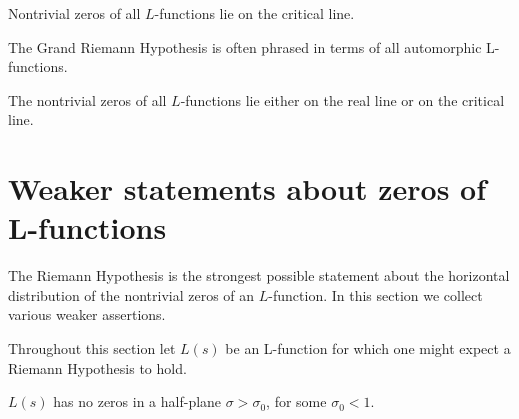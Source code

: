 \documentclass[12pt,letterpaper, reqno]{amsart}
\begin{document}
\begin{problemblock}
\begin{problem}[1.5]
Nontrivial zeros of all $L$-functions
lie on the critical line.
\end{problem}

\begin{distinguishedremark}
The Grand Riemann Hypothesis is often phrased in terms of
all automorphic L-functions.  
\end{distinguishedremark}
\end{problemblock}

\begin{problemblock}
\begin{problem}[1.6]
The nontrivial zeros of all $L$-functions
lie either on the real line or on the critical line.
\end{problem}

\end{problemblock}



\section{Weaker statements about zeros of L-functions}
The Riemann Hypothesis is the strongest possible statement
about the horizontal distribution of the nontrivial zeros
of an $L$-function.  In this section we collect various
weaker assertions. 

Throughout this section let $L(s)$ be an L-function
for which one might expect a Riemann Hypothesis to hold.

\begin{problemblock} 

\begin{problem}[2.1]
 $L(s)$
has no zeros in a half-plane
$\sigma > \sigma_0$, for some $\sigma_0 <1 $.
\end{problem}

\end{problemblock}
\end{document}
